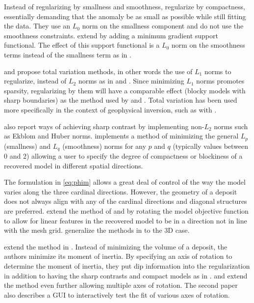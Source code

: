 Instead of regularizing by smallness and smoothness, \cite{last1983compact} regularize by compactness, essentially demanding that the anomaly be as small as possible while still fitting the data. They use an $L_0$ norm on the smallness component and do not use the smoothness constraints. \cite{portniaguine1999focusing} extend  \cite{last1983compact} by adding a minimum gradient support functional. The effect of this support functional is a $L_0$ norm on the smoothness terms instead of the smallness term as in \cite{last1983compact}.

\cite{rudin1992nonlinear} and \cite{vogel1998fast} propose total variation methods, in other words the use of $L_1$ norms to regularize, instead of $L_2$ norms as in \cite{li19963} and \cite{li19983}. Since minimizing $L_1$ norms promotes sparsity, regularizing by them will have a comparable effect (blocky models with sharp boundaries) as the method used by \cite{last1983compact} and \cite{portniaguine1999focusing}. Total variation has been used more specifically in the context of geophysical inversion, such as with \cite{guitton2012blocky}.	

\cite{farquharson1998non} also report ways of achieving sharp contrast by implementing non-$L_2$ norms such as Ekblom and Huber norms. \cite{fournier2015cooperative} implements a method of minimizing the general $L_p$ (smallness) and $L_q$ (smoothness) norms for any $p$ and $q$ (typically values between 0 and 2) allowing a user to specify the degree of compactness or blockiness of a recovered model in different spatial directions.

The formulation in \autoref{eq:phim} allows a great deal of control of the way the model varies along the three cardinal directions. However, the geometry of a deposit does not always align with any of the cardinal directions and diagonal structures are preferred. \cite{li2000incorporating}  extend the method of \cite{li19963} and \cite{li19983} by rotating the model objective function to allow for linear features in the recovered model to be in a direction not in line with the mesh grid. \cite{lelievre2009comprehensive} generalize the methods in \cite{li2000incorporating} to the 3D case.

\cite{guillen1984gravity} extend the method in \cite{last1983compact}. Instead of minimizing the volume of a deposit, the authors minimize its moment of inertia. By specifying an axis of rotation to determine the moment of inertia, they put dip information into the regularization in addition to having the sharp contrasts and compact models as in \cite{last1983compact}.  \cite{barbosa1994generalized} and \cite{barbosa2006interactive} extend the method even further allowing multiple axes of rotation. The second paper also describes a GUI to interactively test the fit of various axes of rotation.

